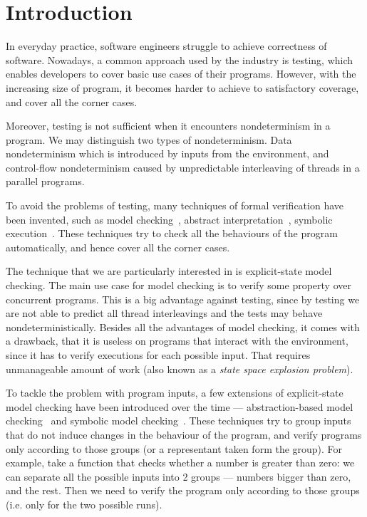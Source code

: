 \chapter{Introduction}\label{ch:Introduction}


\noindent

In everyday practice, software engineers struggle to achieve correctness of
software. Nowadays, a common approach used by the industry is testing, which
enables developers to cover basic use cases of their programs. However, with the
increasing size of program, it becomes harder to achieve to satisfactory
coverage, and cover all the corner cases.

Moreover, testing is not sufficient when it encounters nondeterminism in a
program. We may distinguish two types of nondeterminism. Data nondeterminism
which is introduced by inputs from the environment, and control-flow
nondeterminism caused by unpredictable interleaving of threads in a parallel
programs.

To avoid the problems of testing, many techniques of formal verification have
been invented, such as model checking~\cite{Baier08}, abstract
interpretation~\cite{Cousot14}, symbolic execution~\cite{King76}. These
techniques try to check all the behaviours of the program automatically, and
hence cover all the corner cases.

The technique that we are particularly interested in is explicit-state model
checking. The main use case for model checking is to verify
some property over concurrent programs. This is a big advantage against
testing, since by testing we are not able to predict all thread interleavings
and the tests may behave nondeterministically. Besides all the advantages of
model checking, it comes with a drawback, that it is useless on programs that
interact with the environment, since it has to verify executions for each
possible input. That requires unmanageable amount of work (also known as a
\emph{state space explosion problem}).

To tackle the problem with program inputs, a few extensions of explicit-state
model checking have been introduced over the time --- abstraction-based model
checking~\cite{Clarke94} and symbolic model checking~\cite{Clarke96}. These
techniques try to group inputs that do not induce changes in the behaviour of the
program, and verify programs only according to those groups (or a representant
taken form the group). For example, take a function that checks whether a
number is greater than zero: we can separate all the possible inputs into 2 groups --- numbers
bigger than zero, and the rest. Then we need to verify
the program only according to those groups (i.e. only for the two possible runs).

